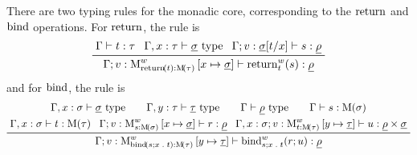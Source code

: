\documentclass[11pt,a4paper]{article}
\theoremstyle{definition}
\theoremstyle{remark}
\providecommand{\casubst}[3]{#1[#3/#2]}
\providecommand{\lintype}[1]{\underline{#1}}
\begin{document}
There are two typing rules for the monadic core, corresponding to the \( \opn[b]{return} \) and \( \opn[b]{bind} \) operations. For \( \opn[b]{return} \), the rule is
\begin{equation}
  \label{eq:target-language-return-typing-law}
  \prftree{
    \Gamma \vdash t : \tau
  }{
    \Gamma, x : \tau \vdash \lintype{\sigma} \text{ type}
  }{
    \Gamma; v : \casubst{\lintype{\sigma}}{x}{t} \vdash s : \lintype{\rho}
  }{
    \Gamma; v : \opn[b]{M}^{w}_{\fn[n]{ \opn[b]{return} }{ t } : \Fun[nn]{ \opn[b]{M} }{ \tau }} \left[ x \mapsto \lintype{\sigma} \right]
    \vdash
    \fn[n]{ \opn[b]{return}^{w}_{t} }{ s }:
    \lintype{\rho}
  }
\end{equation}
and for \( \opn[b]{bind} \), the rule is
\begin{equation}
  \label{eq:target-language-bind-typing-law}
  \begin{gathered}
    \Gamma, x : \sigma \vdash \lintype{\sigma} \text{ type}
    \qquad
    \Gamma, y : \tau \vdash \lintype{\tau} \text{ type}
    \qquad
    \Gamma \vdash \lintype{\rho} \text{ type}
    \qquad
    \Gamma \vdash s : \Fun[nn]{ \opn[b]{M} }{ \sigma }
    \\
    \prftree{
      \Gamma, x : \sigma \vdash t : \Fun[nn]{ \opn[b]{M} }{ \tau }
    }{
      \Gamma; v : \opn[b]{M}^{w}_{s : \Fun[nn]{ \opn[b]{M} }{ \sigma }}
      \left[ x \mapsto \lintype{\sigma} \right]
      \vdash
      r : \lintype{\rho}
    }{
      \Gamma, x : \sigma; v : \opn[b]{M}^{w}_{t : \Fun[nn]{ \opn[b]{M} }{ \tau }} \left[ y \mapsto \lintype{\tau} \right]
      \vdash u : \lintype{\rho} \times \lintype{\sigma}
    }{
      \Gamma; v : \opn[b]{M}^{w}_{\fn[n]{ \opn[b]{bind} }{ s; x \; . \; t } : \Fun[nn]{ \opn[b]{M} }{ \tau }}
      \left[ y \mapsto \lintype{\tau} \right]
      \vdash
      \fn[n]{ \opn[b]{bind}^{w}_{s; x \; . \; t} }{ r; u } : \lintype{\rho}
    }
  \end{gathered}
\end{equation}
\end{document}
